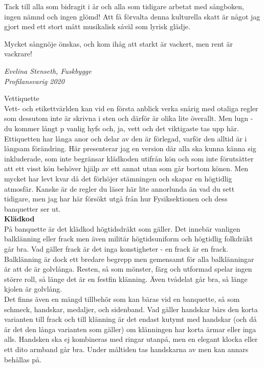 \documentclass[a6paper,12pt]{article}
\begin{document}
Tack till alla som bidragit i år och alla som tidigare arbetat med sångboken, ingen nämnd och ingen glömd! Att få förvalta denna kulturella skatt är något jag gjort med ett stort mått musikalisk såväl som lyrisk glädje.

Mycket sångnöje önskas, och kom ihåg att starkt är vackert, men rent är vackrare! 
\begin{flushright}
\textit{Evelina Stenseth, Fuskbygge\\ Profilansvarig 2020}
\end{flushright}


\newpage



\newpage
\setlength{\oddsidemargin}{-0.57in}
\noindent
\Large Vettiquette\\
\footnotesize Vett- och etikettvärlden kan vid en första anblick verka snårig med otaliga regler som dessutom inte är skrivna i sten och därför är olika lite överallt. Men lugn - du kommer långt p vanlig hyfs och, ja, vett och det viktigaste tas upp här. Ettiquetten har långa anor och delar av den är förlegad, varför den alltid är i långsam förändring. Här presenterar jag en version där alla ska kunna känna sig inkluderade, som inte begränsar klädkoden utifrån kön och som inte förutsätter att ett visst kön behöver hjälp av ett annat utan som går bortom könen. Men mycket har levt kvar då det förhöjer stämningen och skapar en högtidlig atmosfär. Kanske är de regler du läser här lite annorlunda än vad du sett tidigare, men jag har här försökt utgå från hur Fysiksektionen och dess banquetter ser ut.\\
\normalsize\textbf{Klädkod}\\
\footnotesize På banquette är det klädkod högtidsdräkt som gäller. Det innebär vanligen balklänning eller frack men även militär högtidsuniform och högtidlig folkdräkt går bra. Vad gäller frack är det inga konstigheter - en frack är en frack. Balklänning är dock ett bredare begrepp men gemensamt för alla balklänningar är att de är golvlånga. Resten, så som mönster, färg och utformad spelar ingen större roll, så länge det är en festfin klänning. Även tvådelat går bra, så länge kjolen är golvlång.\\
Det finns även en mängd tillbehör som kan bäras vid en banquette, så som schmeck, handskar, medaljer, och sidenband. Vad gäller handskar bärs den korta 
\newpage
\setlength{\oddsidemargin}{-0.37in}
\noindent
varianten till frack och till klänning är det endast kutymt med handskar (och då är det den långa varianten som gäller) om klänningen har korta ärmar eller inga alls. Handsken ska ej kombineras med ringar utanpå, men en elegant klocka eller ett dito armband går bra. Under måltiden tas handskarna av men kan annars behållas på.\\
\end{document}
